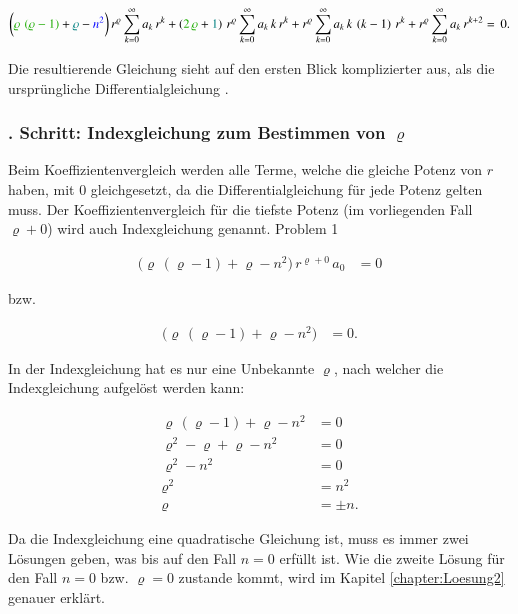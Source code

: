 \begin{align}
	\biggl(
	\textcolor{mygreen}{\varrho \, \left( \varrho - 1 \right)}
	+ 
	\textcolor{teal}{\varrho}
	-
	\textcolor{blue}{n^2}
	\biggr)
	\, r^{\varrho}
	\sum_{k=0}^{\infty} a_k \, r^k
	+ 
	\left(	
	\textcolor{mygreen}{2 \, \varrho}
	+
	\textcolor{teal}{1}
	\right)
	\, r^{\varrho}
	\sum_{k=0}^{\infty} a_k \, k \, r^k
	+
	r^{\varrho}
	\sum_{k=0}^{\infty} a_k \, k \, \left( k - 1 \right) \, r^k
	+ 
	r^{\varrho}
	\sum_{k=0}^{\infty} a_k \, r^{k + 2}
	= \, 0
	\label{eq:bessel:potenzreihe:dgl:vereinfacht}
	\text{.}
\end{align}
\begin{normalsize}%
Die resultierende Gleichung  sieht auf den ersten Blick komplizierter aus,
als die urspr\"ungliche Differentialgleichung .
\end{normalsize}
\subsubsection{. Schritt: Indexgleichung zum Bestimmen von $\varrho$}
\begin{normalsize}%
Beim Koeffizientenvergleich werden alle Terme,
welche die gleiche Potenz von $r$ haben,
mit $0$ gleichgesetzt,
da die Differentialgleichung f\"ur jede Potenz gelten muss.
Der Koeffizientenvergleich f\"ur die tiefste Potenz (im vorliegenden Fall $\varrho + 0$) wird auch Indexgleichung genannt.
Problem 1
\end{normalsize}
\begin{align}
	\big( \varrho \, \left( \varrho -1 \right) + \varrho - n^2 \big)
	\, r^{\varrho + 0} \, a_0 &= 0
	\label{eq:bessel:indexgleichung:ausgangslage}
\end{align}
\begin{normalsize}%
bzw.
\end{normalsize}
\begin{align}
	\big( \varrho \, \left( \varrho -1 \right) + \varrho - n^2 \big) &= 0
	\label{eq:bessel:indexgleichung:ausgangslage:vereinfacht}
	\text{.}
\end{align}
\begin{normalsize}%
In der Indexgleichung  hat es nur eine Unbekannte $\varrho$,
nach welcher die Indexgleichung aufgel\"ost werden kann:
\end{normalsize}
\begin{align*}
	\varrho \, \left( \varrho -1 \right) + \varrho - n^2 &= 0 \\
	\varrho ^2 - \varrho + \varrho -n^2 &= 0  \\
	\varrho ^2 - n^2 &= 0 \\
	\varrho ^2 &= n^2 \\
	\varrho &= \pm n
	\text{.}
\end{align*}
\begin{normalsize}%
Da die Indexgleichung eine quadratische Gleichung ist,
muss es immer zwei L\"osungen geben,
was bis auf den Fall $n = 0$ erf\"ullt ist.
Wie die zweite L\"osung f\"ur den Fall $n = 0$ bzw. $\varrho = 0$ zustande kommt,
wird im Kapitel \ref{chapter:Loesung2} genauer erkl\"art.
\end{normalsize}
